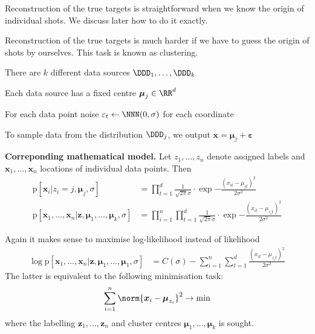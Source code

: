 \documentclass[landscape,footrule]{foils}
\newcommand{\pd}[1]{\mathrm{p}[#1]}
\renewcommand{\vec}[1]{\boldsymbol{#1}}
\begin{document}

Reconstruction of the true targets is straightforward when we know the origin of individual shots. We discuss later how to do it exactly.\vspace*{-1cm}



Reconstruction of the true targets is much harder if we have to guess the origin of shots by ourselves. This task is known as clustering.\vspace*{-1cm}



\begin{triangles}
\item There are $k$ different data sources $\DDD_1,\ldots,\DDD_k$
\item Each data source has a fixed centre $\vec{\mu}_j\in\RR^d$
\item For each data point noise $\varepsilon_t\gets\NNN(0,\sigma)$ for each coordinate
\item To sample data from the distribution $\DDD_j$, we output $\vec{x}=\vec{\mu}_j+\vec{\varepsilon}$ 
\end{triangles}
\vspace*{1cm}

\textbf{Correponding mathematical model.} Let $z_1,\ldots, z_n$ denote assigned labels and $\vec{x}_1,\ldots,\vec{x}_n$ locations of individual data points. Then
\begin{align*}
\pd{\vec{x}_i|z_i=j,\vec{\mu}_j,\sigma}&=\prod_{t=1}^d\frac{1}{\sqrt{2\pi}\sigma}\cdot\exp{-\frac{(x_{it}-\mu_{jt})^2}{2\sigma^2}}\\
\pd{\vec{x}_1,\ldots,\vec{x}_n|\vec{z},\vec{\mu}_1,\ldots,\vec{\mu}_k,\sigma}&=\prod_{i=1}^n
\prod_{t=1}^d\frac{1}{\sqrt{2\pi}\sigma}\cdot\exp{-\frac{(x_{it}-\mu_{z_it})^2}{2\sigma^2}}
\end{align*}


\enlargethispage{1cm}
Again it makes sense to maximise log-likelihood instead of likelihood
\begin{align*}
\log \pd{\vec{x}_1,\ldots,\vec{x}_n|\vec{z},\vec{\mu}_1,\ldots,\vec{\mu}_1,\sigma}&= C(\sigma) - 
\sum_{i=1}^n
\sum_{t=1}^d\frac{(x_{it}-\mu_{z_it})^2}{2\sigma^2}
\end{align*}
The latter is equivalent to the following minimisation task:
\begin{align*}
\sum_{i=1}^n\norm{\vec{x}_i-\vec{\mu}_{z_i}}^2\to\min
\end{align*}
where  the labelling $\vec{z}_1,\ldots,\vec{z}_n$ and cluster centres $\vec{\mu}_1,\ldots,\vec{\mu}_k$ is sought.
\end{document}
